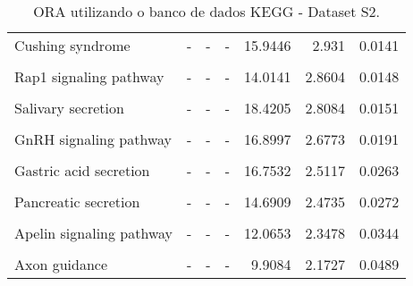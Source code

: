 \begin{table}[!htbp]
{\begin{tabular}[h]{p{10cm}rrrrrr}
Cushing syndrome & - & - & - & 15.9446 & 2.931 & 0.0141\\
\cellcolor{gray!6}{Dopaminergic synapse} & \cellcolor{gray!6}{-} & \cellcolor{gray!6}{-} & \cellcolor{gray!6}{-} & \cellcolor{gray!6}{17.1484} & \cellcolor{gray!6}{2.9551} & \cellcolor{gray!6}{0.0141}\\
Rap1 signaling pathway & - & - & - & 14.0141 & 2.8604 & 0.0148\\
\cellcolor{gray!6}{Inflammatory mediator regulation of TRP channels} & \cellcolor{gray!6}{-} & \cellcolor{gray!6}{-} & \cellcolor{gray!6}{-} & \cellcolor{gray!6}{18.0156} & \cellcolor{gray!6}{2.8474} & \cellcolor{gray!6}{0.0148}\\
Salivary secretion & - & - & - & 18.4205 & 2.8084 & 0.0151\\
\cellcolor{gray!6}{Retrograde endocannabinoid signaling} & \cellcolor{gray!6}{-} & \cellcolor{gray!6}{-} & \cellcolor{gray!6}{-} & \cellcolor{gray!6}{14.9165} & \cellcolor{gray!6}{2.7683} & \cellcolor{gray!6}{0.016}\\
GnRH signaling pathway & - & - & - & 16.8997 & 2.6773 & 0.0191\\
\cellcolor{gray!6}{Thyroid hormone synthesis} & \cellcolor{gray!6}{-} & \cellcolor{gray!6}{-} & \cellcolor{gray!6}{-} & \cellcolor{gray!6}{17.3365} & \cellcolor{gray!6}{2.5584} & \cellcolor{gray!6}{0.0244}\\
Gastric acid secretion & - & - & - & 16.7532 & 2.5117 & 0.0263\\
\cellcolor{gray!6}{Cell adhesion molecules (CAMs)} & \cellcolor{gray!6}{-} & \cellcolor{gray!6}{-} & \cellcolor{gray!6}{-} & \cellcolor{gray!6}{12.7955} & \cellcolor{gray!6}{2.4777} & \cellcolor{gray!6}{0.0272}\\
Pancreatic secretion & - & - & - & 14.6909 & 2.4735 & 0.0272\\
\cellcolor{gray!6}{HIF-1 signaling pathway} & \cellcolor{gray!6}{-} & \cellcolor{gray!6}{-} & \cellcolor{gray!6}{-} & \cellcolor{gray!6}{13.906} & \cellcolor{gray!6}{2.3967} & \cellcolor{gray!6}{0.0315}\\
Apelin signaling pathway & - & - & - & 12.0653 & 2.3478 & 0.0344\\
\cellcolor{gray!6}{cGMP-PKG signaling pathway} & \cellcolor{gray!6}{-} & \cellcolor{gray!6}{-} & \cellcolor{gray!6}{-} & \cellcolor{gray!6}{10.5422} & \cellcolor{gray!6}{2.2295} & \cellcolor{gray!6}{0.044}\\
Axon guidance & - & - & - & 9.9084 & 2.1727 & 0.0489\\

\bottomrule
\end{tabular}}

\caption{ORA utilizando o banco de dados KEGG - Dataset S2.}
\label{tab:ds2_kegg_ora_persnp}

\end{table}
